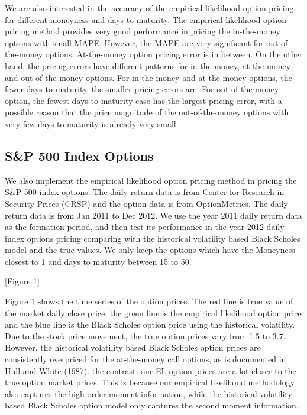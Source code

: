 We are also interested in the accuracy of the empirical likelihood option pricing for different moneyness and days-to-maturity. The empirical likelihood option pricing method provides very good performance in pricing the in-the-money options with small MAPE. However, the MAPE are very significant for out-of-the-money options. At-the-money option pricing error is in between. On the other hand, the pricing errors have different patterns for in-the-money, at-the-money and out-of-the-money options. For in-the-money and at-the-money options, the fewer days to maturity, the smaller pricing errors are. For out-of-the-money option, the fewest days to maturity case has the largest pricing error, with a possible reason that the price magnitude of the out-of-the-money options with very few days to maturity is already very small.  

\subsection{S\&P 500 Index Options}

We also implement the empirical likelihood option pricing method in pricing the S\&P 500 index options. The daily return data is from Center for Research in Security Prices (CRSP) and the option data is from OptionMetrics. The daily return data is from Jan 2011 to Dec 2012. We use the year 2011 daily return data as the formation period, and then test its performance in the year 2012 daily index options pricing comparing with the historical volatility based Black Scholes model and the true values. We only keep the options which have the Moneyness closest to 1 and days to maturity between 15 to 50. 
\begin{center}
[Figure 1]
\end{center}

Figure 1 shows the time series of the option prices. The red line is true value of the market daily close price, the green line is the empirical likelihood option price and the blue line is the Black Scholes option price using the historical volatility. Due to the stock price movement, the true option prices vary from 1.5 to 3.7. However, the historical volatility based Black Scholes option prices are consistently overpriced for the at-the-money call options, as is documented in Hull and White (1987).  the contrast, our EL option prices are a lot closer to the true option market prices. This is because our empirical likelihood methodology also captures the high order moment information, while the historical volatility based Black Scholes option model only captures the second moment information.   



